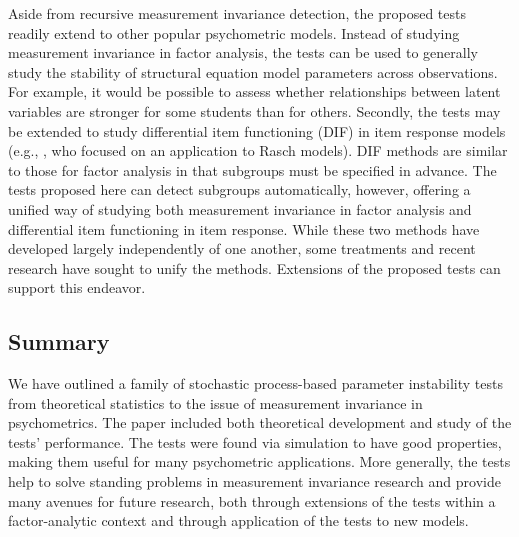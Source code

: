 \documentclass[man]{apa}
\begin{document}

Aside from recursive measurement invariance detection, the proposed tests
readily extend to other popular psychometric models.  
Instead of studying measurement invariance in factor
analysis, the tests can be used to generally 
study the stability of structural equation model parameters across
observations.  For 
example, it would be possible to assess whether relationships between
latent variables are stronger for some students than for
others.  Secondly, 
the tests may be extended to study differential item functioning (DIF)
in item response models (e.g., , who focused on an
application to Rasch models).  
DIF methods are similar to those for factor analysis in
that subgroups must be specified in advance.  The tests proposed here
can detect subgroups automatically, however, offering a unified way of
studying both 
measurement invariance in factor analysis and differential item
functioning in item response.  While these
two methods have developed largely independently of one another,
some treatments \cite{Mcd99} and recent research \cite{StaChe06} have
sought to unify the methods.  Extensions of the proposed tests can
support this endeavor.

\subsection{Summary}
We have outlined a family of 
stochastic process-based parameter instability tests from theoretical
statistics to the issue of measurement invariance in psychometrics.
The paper included both theoretical development and 
study of the tests' performance.  The tests were found via simulation
to have good properties, making them useful for many psychometric
applications.  More generally, the tests help to
solve standing problems in
measurement invariance research and provide many avenues for
future research, both through extensions of the tests within a
factor-analytic context and through application of the tests to new
models.


\end{document}
